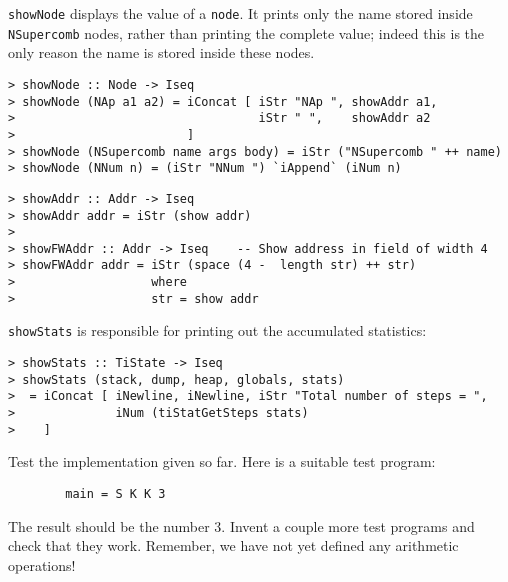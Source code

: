 %
%
%
\par
\mbox{\tt showNode} displays the value of a \mbox{\tt node}.
It prints only the name stored
inside \mbox{\tt NSupercomb} nodes, rather than printing the
complete value; indeed this is the only reason the name is stored inside
these nodes.
\begin{verbatim}
> showNode :: Node -> Iseq
> showNode (NAp a1 a2) = iConcat [ iStr "NAp ", showAddr a1,
>                                  iStr " ",    showAddr a2
>                        ]
> showNode (NSupercomb name args body) = iStr ("NSupercomb " ++ name)
> showNode (NNum n) = (iStr "NNum ") `iAppend` (iNum n)
\end{verbatim}
%
%
%
%
\begin{verbatim}
> showAddr :: Addr -> Iseq
> showAddr addr = iStr (show addr)
>
> showFWAddr :: Addr -> Iseq    -- Show address in field of width 4
> showFWAddr addr = iStr (space (4 -  length str) ++ str)
>                   where
>                   str = show addr
\end{verbatim}
%
%
%
%
\par
\mbox{\tt showStats} is responsible for printing out the accumulated statistics:
\begin{verbatim}
> showStats :: TiState -> Iseq
> showStats (stack, dump, heap, globals, stats)
>  = iConcat [ iNewline, iNewline, iStr "Total number of steps = ",
>              iNum (tiStatGetSteps stats)
>    ]
\end{verbatim}
%
%

\begin{exercise}
\label{ex:templ:test}
Test the implementation given so far.  Here is a suitable test program:
\begin{verbatim}
        main = S K K 3
\end{verbatim}
The result should be the number 3.
Invent a couple more test programs and check that they work.
Remember, we have not yet defined any arithmetic operations!
\end{exercise}

